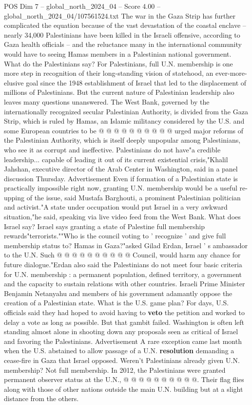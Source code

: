 \begin{textsample}{POS Dim 7 – global\_north\_2024\_04 – Score 4.00 – global\_north\_2024\_04/107561524.txt}
The war in the Gaza Strip has further complicated the equation because of the vast devastation of the coastal enclave -- nearly 34,000 Palestinians have been killed in the Israeli offensive, according to Gaza health officials -- and the reluctance many in the international community would have to seeing Hamas members in a Palestinian national government.
What do the Palestinians say?
For Palestinians, full U.N. membership is one more step in recognition of their long-standing vision of statehood, an ever-more-elusive goal since the 1948 establishment of Israel that led to the displacement of millions of Palestinians.
But the current nature of Palestinian leadership also leaves many questions unanswered.
The West Bank, governed by the internationally recognized secular Palestinian Authority, is divided from the Gaza Strip, which is ruled by Hamas, an Islamic militancy considered by the U.S. and some European countries to be @ @ @ @ @ @ @ @ @ @ urged major reforms of the Palestinian Authority, which is itself deeply unpopular among Palestinians, who see it as corrupt and ineffective.
Palestinians do not have"a credible leadership... capable of leading it out of its current existential crisis,"Khalil Jahshan, executive director of the Arab Center in Washington, said in a panel discussion Thursday.
Advertisement Even if formation of a Palestinian state is practically impossible right now, granting U.N. membership would be a useful re-upping of the issue, said Mustafa Barghouti, a prominent Palestinian politician and activist."A state under occupation would put Israel in a very awkward situation,"he said, speaking via live video feed from the West Bank.
What does Israel say?
Israel says granting a state of Palestine full membership rewards"terrorists.""Who is the council voting to ' recognize ' and give full membership status to?
Hamas in Gaza?"asked Gilad Erdan, Israel ' s ambassador to the U.N.
Such @ @ @ @ @ @ @ @ @ @ Council, would harm any chance for future dialogue."Erdan also said the Palestinians do not meet four basic criteria for U.N. membership : a permanent population, defined territory, a government and the capacity to sustain relations with other countries.
Israeli Prime Minister Benjamin Netanyahu and members of his government adamantly oppose the creation of a Palestinian state.
What is the U.S. game plan?
For days, U.S. officials said they had hoped to avoid having to \textbf{veto} the petition and worked to delay a vote as long as possible.
But that gambit failed.
Washington is often left standing almost alone in shooting down any proposals seen as critical of Israel and favoring the Palestinians.
Advertisement A rare exception came last month when the U.S. abstained to allow passage of a U.N. \textbf{resolution} demanding a cease-fire in Gaza that Israel opposed.
Weren't Palestinians already given U.N. membership?
Not full membership.
In 2012, the Palestinians were granted permanent observer status at the U.N., @ @ @ @ @ @ @ @ @ @.
Their flag flies along with those of other nations outside the main U.N. building but at a slight distance from the others.

\end{textsample}
